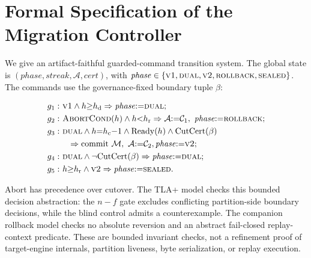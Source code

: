 \documentclass[journal]{IEEEtran}
\theoremstyle{definition}
\theoremstyle{remark}
\begin{document}
\section{Formal Specification of the Migration Controller}
\label{app:spec}
We give an artifact-faithful guarded-command transition system. The global state is
$(\mathit{phase},\mathit{streak},\mathcal{A},\mathit{cert})$, with
$\mathit{phase}\in\{\textsc{v1},\textsc{dual},\textsc{v2},\textsc{rollback},\textsc{sealed}\}$.
The commands use the governance-fixed boundary tuple $\beta$:
\begin{small}
\begin{align*}
g_1:&\ \textsc{v1}\wedge h{\ge}h_{\mathrm{d}} \Rightarrow \mathit{phase}{:=}\textsc{dual};\\
g_2:&\ \textsc{AbortCond}(h)\wedge h{<}h_{\mathrm{r}}
 \Rightarrow \mathcal{A}{:=}\mathcal{C}_1,\ \mathit{phase}{:=}\textsc{rollback};\\
g_3:&\ \textsc{dual}\wedge h{=}h_{\mathrm{c}}{-}1\wedge\mathrm{Ready}(h)
 \wedge\mathrm{CutCert}(\beta)\\
 &\quad\Rightarrow \text{commit }\mathcal{M},\ \mathcal{A}{:=}\mathcal{C}_2,
 \mathit{phase}{:=}\textsc{v2};\\
g_4:&\ \textsc{dual}\wedge\neg\mathrm{CutCert}(\beta)
 \Rightarrow \mathit{phase}{:=}\textsc{dual};\\
g_5:&\ h{\ge}h_{\mathrm{r}}\wedge\textsc{v2}
 \Rightarrow \mathit{phase}{:=}\textsc{sealed}.
\end{align*}
\end{small}
Abort has precedence over cutover. The TLA+ model checks this bounded decision abstraction: the
$n-f$ gate excludes conflicting partition-side boundary decisions, while the blind control admits a
counterexample. The companion rollback model checks no absolute reversion and an abstract fail-closed
replay-context predicate. These are bounded invariant checks, not a refinement proof of target-engine
internals, partition liveness, byte serialization, or replay execution.
\end{document}
